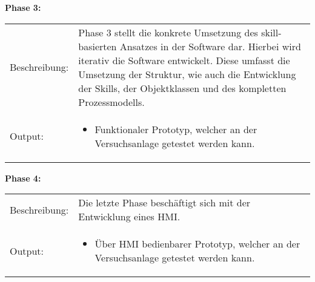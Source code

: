 	\textbf{Phase 3:} \vspace{2mm} 
	\\
		\begin{tabularx}{\textwidth}{@{}>{}p{7em} X@{}}
			Beschreibung: & 
			Phase 3 stellt die konkrete Umsetzung des skill-basierten Ansatzes in der Software dar. Hierbei wird iterativ die Software entwickelt. Diese umfasst die Umsetzung der Struktur, wie auch die Entwicklung der Skills, der Objektklassen und des kompletten Prozessmodells.  
			\\
	
			Output: & 
			\begin{itemize}
				\item Funktionaler Prototyp, welcher an der Versuchsanlage getestet werden kann.
			\end{itemize}
		\end{tabularx}
	
	\textbf{Phase 4:} \vspace{2mm} 
	\\
		\begin{tabularx}{\textwidth}{@{}>{}p{7em} X@{}}
			Beschreibung: & 
			Die letzte Phase beschäftigt sich mit der Entwicklung eines HMI.  
			\\
			
			Output: & 
			\begin{itemize}
				\item Über HMI bedienbarer Prototyp, welcher an der Versuchsanlage getestet werden kann.
			\end{itemize}
		\end{tabularx}
	
	